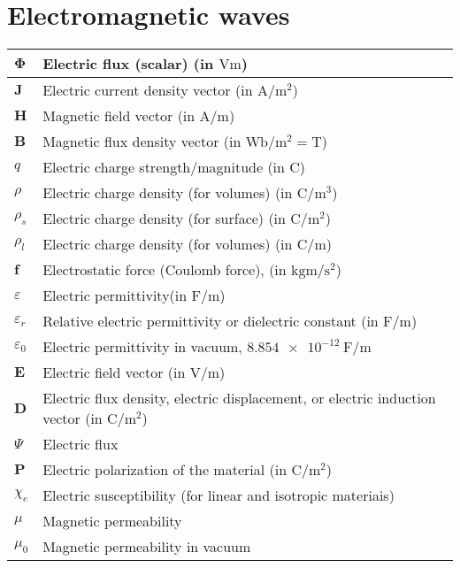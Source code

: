 \documentclass{article}
\begin{document}
\section{Electromagnetic waves}
\begin{xltabular}{\textwidth}{XX}
    \(\mathbf{\Phi}\) & Electric flux (scalar) (in \(\si{\volt\meter}\))\\ \hline
    \(\mathbf{J}\) & Electric current density vector (in \(\si{\ampere\per\square\meter}\))\\ \hline
    \(\mathbf{H}\) & Magnetic field vector (in \(\si{\ampere\per\meter}\))\\ \hline
    \(\mathbf{B}\) & Magnetic flux density vector (in \(\si{\weber\per\meter\squared} = \si{\tesla}\))\\ \hline
    \(q\) & Electric charge strength/magnitude (in \(\si{\coulomb}\)) \\ \hline
    \(\rho\) & Electric charge density (for volumes) (in \(\si{\coulomb\per\meter^3}\)) \\ \hline
    \(\rho_s\) & Electric charge density (for surface) (in \(\si{\coulomb\per\meter^2}\)) \\ \hline
    \(\rho_l\) & Electric charge density (for volumes) (in \(\si{\coulomb\per\meter}\)) \\ \hline
    \(\mathbf{f}\) & Electrostatic force (Coulomb force), (in \(\si{\kilo\gram\meter\per\second\squared}\)) \\ \hline
    \(\varepsilon\) & Electric permittivity(in \(\si{\farad\per\meter}\)) \cite{ramoFieldsWavesCommunication1994} \\ \hline
    \(\varepsilon_r\) & Relative electric permittivity or dielectric constant (in \(\si{\farad\per\meter}\)) \cite{ramoFieldsWavesCommunication1994} \\ \hline
    \(\varepsilon_0\) & Electric permittivity in vacuum, \(\SI{8.854e-12}{\farad\per\meter}\) \cite{ramoFieldsWavesCommunication1994} \\ \hline
    \(\mathbf{E}\) & Electric field vector (in \(\si{\volt\per\meter}\))\\ \hline
    \(\mathbf{D}\) & Electric flux density, electric displacement, or electric induction vector (in \(\si{\coulomb\per\meter\squared}\))\\ \hline
    \(\varPsi\) & Electric flux\\ \hline
    \(\mathbf{P}\) & Electric polarization of the material (in \(\si{\coulomb\per\meter\squared}\))\\ \hline
    \(\chi_e\) & Electric susceptibility (for linear and isotropic materiais)\\ \hline
    \(\mu\) & Magnetic permeability \\ \hline
    \(\mu_0\) & Magnetic permeability in vacuum \\
\end{xltabular}
\end{document}
